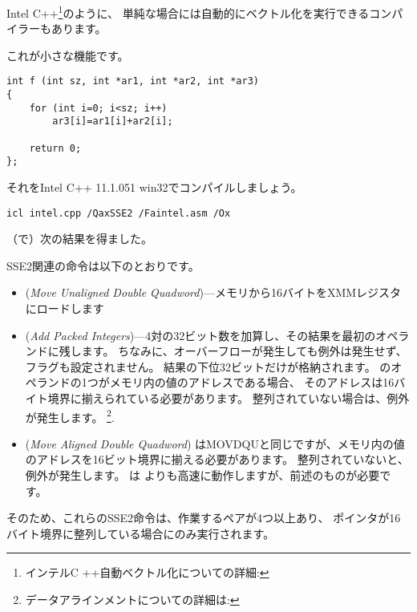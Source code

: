Intel C++\footnote{インテルC ++自動ベクトル化についての詳細: \URLINTELVEC}のように、
単純な場合には自動的にベクトル化を実行できるコンパイラーもあります。

これが小さな機能です。

\begin{lstlisting}[style=customc]
int f (int sz, int *ar1, int *ar2, int *ar3)
{
	for (int i=0; i<sz; i++)
		ar3[i]=ar1[i]+ar2[i];

	return 0;
};
\end{lstlisting}


それをIntel C++ 11.1.051 win32でコンパイルしましょう。

\begin{verbatim}
icl intel.cpp /QaxSSE2 /Faintel.asm /Ox
\end{verbatim}

（\IDA で）次の結果を得ました。



SSE2関連の命令は以下のとおりです。
\begin{itemize}
\item
\MOVDQU (\emph{Move Unaligned Double Quadword})---メモリから16バイトをXMMレジスタにロードします

\item
\PADDD (\emph{Add Packed Integers})---4対の32ビット数を加算し、その結果を最初のオペランドに残します。
ちなみに、オーバーフローが発生しても例外は発生せず、フラグも設定されません。
結果の下位32ビットだけが格納されます。 
\PADDD のオペランドの1つがメモリ内の値のアドレスである場合、
そのアドレスは16バイト境界に揃えられている必要があります。
整列されていない場合は、例外が発生します。
\footnote{データアラインメントについての詳細は: \URLWPDA}.

\item
\MOVDQA (\emph{Move Aligned Double Quadword})
はMOVDQUと同じですが、メモリ内の値のアドレスを16ビット境界に揃える必要があります。
整列されていないと、例外が発生します。 
\MOVDQA は \MOVDQU よりも高速に動作しますが、前述のものが必要です。

\end{itemize}

そのため、これらのSSE2命令は、作業するペアが4つ以上あり、
ポインタが16バイト境界に整列している場合にのみ実行されます。

